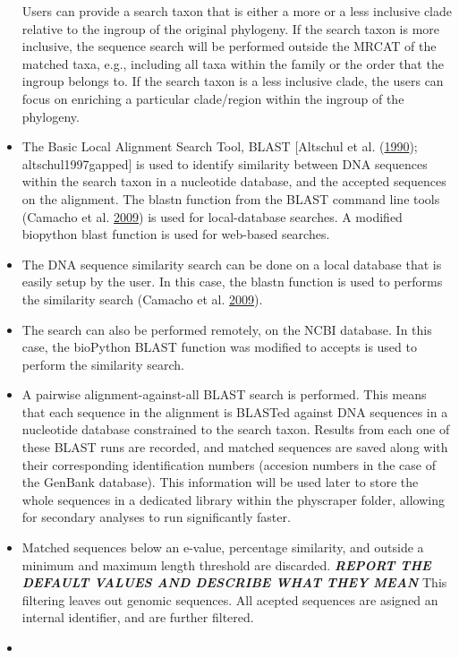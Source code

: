 \documentclass[]{article}
\begin{document}
\begin{itemize}
  Users can provide a search taxon that is either a more or a less inclusive
  clade relative to the ingroup of the original phylogeny. If the search taxon is more inclusive, the sequence search will be performed outside the MRCAT of the matched taxa, e.g., including all taxa within
  the family or the order that the ingroup belongs to. If the search taxon is a less inclusive clade, the users can focus on enriching a particular clade/region within the ingroup of the phylogeny.
\item
  The Basic Local Alignment Search Tool, BLAST {[}Altschul et al. (\protect\hyperlink{ref-altschul1990basic}{1990}); altschul1997gapped{]} is used to identify
  similarity between DNA sequences within the search taxon in a nucleotide
  database, and the accepted sequences on the alignment.
  The blastn function from the BLAST command line tools (Camacho et al. \protect\hyperlink{ref-camacho2009blast}{2009}) is used for local-database searches.
  A modified biopython blast function is used for web-based searches.
\item
  The DNA sequence similarity search can be done on a local database that is easily
  setup by the user. In this case, the blastn function is used to performs the similarity search (Camacho et al. \protect\hyperlink{ref-camacho2009blast}{2009}).
\item
  The search can also be performed remotely, on the NCBI database. In this case, the
  bioPython BLAST function was modified to accepts is used to perform the similarity search.
\item
  A pairwise alignment-against-all BLAST search is performed. This means that each sequence
  in the alignment is BLASTed against DNA sequences in a nucleotide database constrained to the search
  taxon. Results from each one of these BLAST runs are recorded, and matched sequences are saved
  along with their corresponding identification numbers (accesion numbers in the case of the GenBank database). This information will be used later to store the whole sequences in a dedicated library within the physcraper folder, allowing for secondary analyses to run significantly faster.
\item
  Matched sequences below an e-value, percentage similarity, and outside a minimum
  and maximum length threshold are discarded. \textbf{\emph{REPORT THE DEFAULT VALUES AND DESCRIBE WHAT THEY MEAN}} This filtering leaves out genomic sequences.
  All acepted sequences are asigned an internal identifier, and are further filtered.
\item

\end{itemize}
\end{document}
